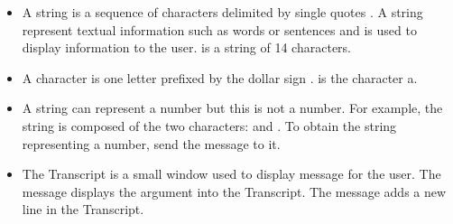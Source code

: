 \begin{itemize}
\item A string is a sequence of characters delimited by  single quotes . A string  represent textual information such as words or sentences and is used to display information to the user.  is a string of 14 characters. 

\item A character is one letter prefixed by the dollar sign \ct{\$}.  is the character a.

\item A string can represent a number but this is not a number. For example, the string  is composed of the two characters:  and . To obtain the string representing a number, send the message  to it.

\item The Transcript is a small window used to display message for the user. 
The message  displays the argument into the Transcript. The message  adds a new line in the Transcript. 
\end{itemize}

\ifx\wholebook\relax\else
\fi
